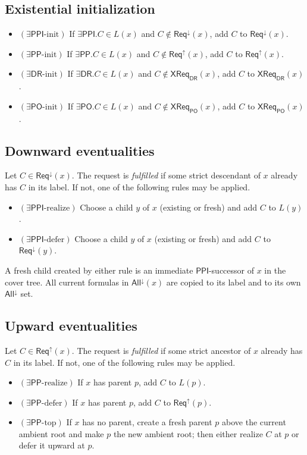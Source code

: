 \documentclass[11pt]{article}
\theoremstyle{remark}
\newcommand{\DR}{\mathsf{DR}}
\newcommand{\PO}{\mathsf{PO}}
\newcommand{\PP}{\mathsf{PP}}
\newcommand{\PPI}{\mathsf{PPI}}
\newcommand{\ReqUp}{\mathsf{Req}^{\uparrow}}
\newcommand{\ReqDown}{\mathsf{Req}^{\downarrow}}
\newcommand{\AllDown}{\mathsf{All}^{\downarrow}}
\newcommand{\CrossDR}{\mathsf{XReq}_{\DR}}
\newcommand{\CrossPO}{\mathsf{XReq}_{\PO}}
\begin{document}
\subsection{Existential initialization}

\begin{itemize}
    \item $(\exists\PPI\text{-init})$ If $\exists\PPI.C\in L(x)$ and $C\notin \ReqDown(x)$, add $C$ to $\ReqDown(x)$.
    \item $(\exists\PP\text{-init})$ If $\exists\PP.C\in L(x)$ and $C\notin \ReqUp(x)$, add $C$ to $\ReqUp(x)$.
    \item $(\exists\DR\text{-init})$ If $\exists\DR.C\in L(x)$ and $C\notin \CrossDR(x)$, add $C$ to $\CrossDR(x)$.
    \item $(\exists\PO\text{-init})$ If $\exists\PO.C\in L(x)$ and $C\notin \CrossPO(x)$, add $C$ to $\CrossPO(x)$.
\end{itemize}

\subsection{Downward eventualities}

Let $C\in \ReqDown(x)$. The request is \emph{fulfilled} if some strict descendant of $x$ already has $C$ in its label. If not, one of the following rules may be applied.

\begin{itemize}
    \item $(\exists\PPI\text{-realize})$ Choose a child $y$ of $x$ (existing or fresh) and add $C$ to $L(y)$.
    \item $(\exists\PPI\text{-defer})$ Choose a child $y$ of $x$ (existing or fresh) and add $C$ to $\ReqDown(y)$.
\end{itemize}

A fresh child created by either rule is an immediate $\PPI$-successor of $x$ in the cover tree. All current formulas in $\AllDown(x)$ are copied to its label and to its own $\AllDown$ set.

\subsection{Upward eventualities}

Let $C\in \ReqUp(x)$. The request is \emph{fulfilled} if some strict ancestor of $x$ already has $C$ in its label. If not, one of the following rules may be applied.

\begin{itemize}
    \item $(\exists\PP\text{-realize})$ If $x$ has parent $p$, add $C$ to $L(p)$.
    \item $(\exists\PP\text{-defer})$ If $x$ has parent $p$, add $C$ to $\ReqUp(p)$.
    \item $(\exists\PP\text{-top})$ If $x$ has no parent, create a fresh parent $p$ above the current ambient root and make $p$ the new ambient root; then either realize $C$ at $p$ or defer it upward at $p$.
\end{itemize}
\end{document}
